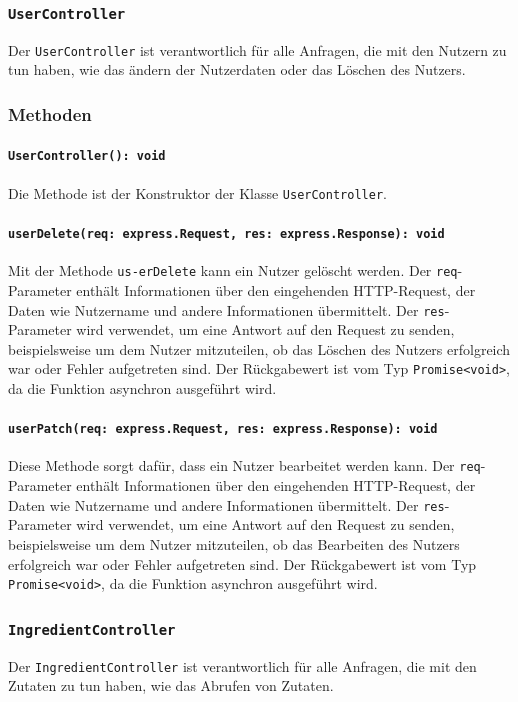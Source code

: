 \documentclass{entwurfsheft}
\begin{document}
\subsubsection{\texttt{UserController}}\label{sec:UserController}
Der \texttt{UserController} ist verantwortlich für alle Anfragen, die mit den Nutzern zu tun haben, wie das ändern der Nutzerdaten oder das Löschen des Nutzers.
\subsubsection*{Methoden}
\paragraph{\texttt{UserController(): void}}
Die Methode ist der Konstruktor der Klasse \texttt{UserController}.
\paragraph{\texttt{userDelete(req: express.Request, res: express.Response): void}}
Mit der Methode \texttt{us-erDelete} kann ein Nutzer gelöscht werden. Der \texttt{req}-Parameter enthält Informationen über den eingehenden HTTP-Request, der Daten wie Nutzername und andere Informationen übermittelt. Der \texttt{res}-Parameter wird verwendet, um eine Antwort auf den Request zu senden, beispielsweise um dem Nutzer mitzuteilen, ob das Löschen des Nutzers erfolgreich war oder Fehler aufgetreten sind.
Der Rückgabewert ist vom Typ \texttt{Promise<void>}, da die Funktion asynchron ausgeführt wird.
\paragraph{\texttt{userPatch(req: express.Request, res: express.Response): void}}
Diese Methode sorgt dafür, dass ein Nutzer bearbeitet werden kann. Der \texttt{req}-Parameter enthält Informationen über den eingehenden HTTP-Request, der Daten wie Nutzername und andere Informationen übermittelt. Der \texttt{res}-Parameter wird verwendet, um eine Antwort auf den Request zu senden, beispielsweise um dem Nutzer mitzuteilen, ob das Bearbeiten des Nutzers erfolgreich war oder Fehler aufgetreten sind.
Der Rückgabewert ist vom Typ \texttt{Promise<void>}, da die Funktion asynchron ausgeführt wird.

\subsubsection{\texttt{IngredientController}}\label{sec:IngredientController}
Der \texttt{IngredientController} ist verantwortlich für alle Anfragen, die mit den Zutaten zu tun haben, wie das Abrufen von Zutaten.
\end{document}
